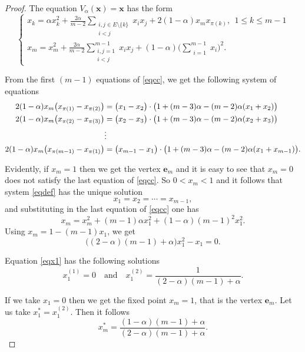 \documentclass[11pt,reqno]{amsart}
\numberwithin{equation}{section} \setcounter{tocdepth}{1}
\begin{document}
\begin{proof}
The equation $V_\alpha(\mathbf{x})=\mathbf{x}$ has the form
\begin{equation}\label{eqcc}
 \left\{\begin{array}{lll}
               x_{k}= \alpha x_k^2 +
               \frac{2\alpha}{m-2}\displaystyle\sum_{\substack{i,j\in E\setminus\{k\}\\ i<j}} x_ix_j + 2(1-\alpha)x_m x_{\pi(k)}, \ \ 1\leq k\leq m-1\\[5mm]
               x_{m}= x_m^2+
               \frac{2\alpha}{m-2}\displaystyle\sum_{\substack{i,j=1\\ i<j}}^{m-1} x_ix_j +
               (1-\alpha) \Big(\displaystyle\sum_{\substack{i=1}}^{m-1} x_i\Big)^2.
\end{array}\right.
\end{equation}

From the first $(m-1)$ equations of \eqref{eqcc}, we get the following system of equations
\begin{align}\label{eqdef}
2(1-\alpha)x_m\big(x_{\pi(1)}-x_{\pi(2)}\big)&=\big(x_1-x_2\big)\cdot\big(1+ (m-3)\alpha -(m-2)\alpha(x_1+x_2) \big)\notag\\
2(1-\alpha)x_m\big(x_{\pi(2)}-x_{\pi(3)}\big)&=\big(x_2-x_3\big)\cdot\big(1+ (m-3)\alpha -(m-2)\alpha(x_2+x_3) \big)\notag\\
               \ \ \ &\vdots \ \ \  \\
2(1-\alpha)x_m\big(x_{\pi(m-1)}-x_{\pi(1)}\big) &=\big(x_{m-1}-x_1\big)\cdot\big(1+ (m-3)\alpha -(m-2)\alpha(x_1+x_{m-1}) \big). \notag
\end{align}

Evidently,   if $x_m=1$ then we get the vertex $\mathbf{e}_m$ and  it is easy to see that $x_m=0$ does not satisfy the last equation of \eqref{eqcc}.
So $0<x_m<1$ and it follows that  system \eqref{eqdef} has the unique solution
\[x_1=x_2=\cdots=x_{m-1},\]
and substituting in the last equation of \eqref{eqcc} one has
\[x_m= x_m^2+ (m-1)\alpha x_1^2+(1-\alpha)(m-1)^2x_1^2.\]
Using $x_m=1-(m-1)x_1$, we get
\begin{equation}\label{eqx1}
\big((2-\alpha)(m-1)+\alpha\big)x_1^2-x_1=0.
\end{equation}

Equation \eqref{eqx1} has the following solutions
\[x_1^{(1)}=0 \quad \text{and} \quad x_1^{(2)}=\frac{1}{ (2-\alpha)(m-1)+\alpha}.\]

If we take $x_1=0$ then we get the fixed point $x_m=1$, that is the vertex  $\mathbf{e}_m$.
Let us take $x_1^*=x_1^{(2)}$. Then it follows
\[x_m^*=\frac{(1-\alpha)(m-1)+\alpha}{ (2-\alpha)(m-1)+\alpha}.\]

\end{proof}
\end{document}
